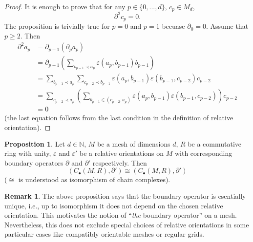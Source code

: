 \documentclass[fleqn]{article}
\theoremstyle{definition}
\newtheorem{proposition}[theorem]{Proposition}
\newtheorem{remark}[theorem]{Remark}
\begin{document}
\begin{proof}
  It is enough to prove that for any $p \in \{0, ..., d\}$, $c_p \in M_d$,
  \begin{equation}
    \partial^2 c_p = 0. 
  \end{equation}
  The proposition is trivially true for $p = 0$ and $p = 1$
  becuase $\partial_0 = 0$.
  Assume that $p \geq 2$.
  Then
  \begin{equation}
    \begin{split}
      \partial^2 a_p
      & = \partial_{p - 1} (\partial_p a_p) \\
      & = \partial_{p - 1}
      \left(
        \sum_{b_{p - 1} \prec a_p} \varepsilon(a_p, b_{p - 1}) b_{p - 1}
      \right) \\
      & =
      \sum_{b_{p - 1} \prec a_p}
        \sum_{c_{p - 2} \prec b_{p - 1}}
            \varepsilon(a_p, b_{p - 1})
            \varepsilon(b_{p - 1}, c_{p - 2})
            c_{p - 2} \\
      & =
      \sum_{c_{p - 2} \prec a_p}
        \left(
          \sum _{b_{p - 1} \in (c_{p - 2}, a_p)}
            \varepsilon(a_p, b_{p - 1}) \varepsilon(b_{p - 1}, c_{p - 2})
        \right)
        c_{p - 2} \\
      & = 0
    \end{split}
  \end{equation}
  (the last equation follows from the last condition in the definition of
  relative orientation).
\end{proof}

\begin{proposition}
  Let
    $d \in \mathbb{N}$,
    $M$ be a mesh of dimensions $d$,
    $R$ be a commutative ring with unity,
    $\varepsilon$ and $\varepsilon'$ be a relative orientations on $M$
      with corresponding boundary operators
      $\partial$ and $\partial'$ respectively.
  Then
  \begin{equation}
    (C_\bullet(M, R), \partial') \cong (C_\bullet(M, R), \partial')
  \end{equation}
  ($\cong$ is understood as isomorphism of chain complexes).
\end{proposition}

\begin{remark}
  The above proposition says that the boundary operator is esentially unique,
  i.e., up to isomorphism it does not depend on the chosen relative orientation.
  This motivates the notion of ``\emph{the} boundary operator'' on a mesh.
  Nevertheless, this does not exclude special choices of relative orientations
  in some particular cases like compatibly orientable meshes or regular grids.
\end{remark}
\end{document}
